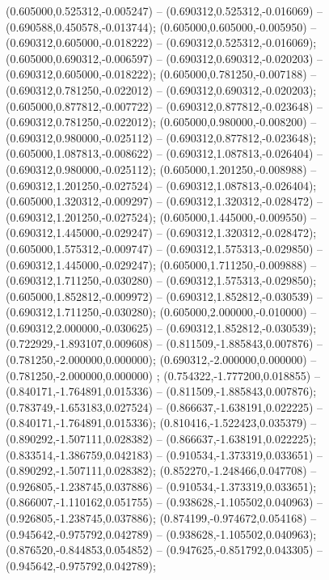  (0.605000,0.525312,-0.005247) -- (0.690312,0.525312,-0.016069) -- (0.690588,0.450578,-0.013744);
 (0.605000,0.605000,-0.005950) -- (0.690312,0.605000,-0.018222) -- (0.690312,0.525312,-0.016069);
 (0.605000,0.690312,-0.006597) -- (0.690312,0.690312,-0.020203) -- (0.690312,0.605000,-0.018222);
 (0.605000,0.781250,-0.007188) -- (0.690312,0.781250,-0.022012) -- (0.690312,0.690312,-0.020203);
 (0.605000,0.877812,-0.007722) -- (0.690312,0.877812,-0.023648) -- (0.690312,0.781250,-0.022012);
 (0.605000,0.980000,-0.008200) -- (0.690312,0.980000,-0.025112) -- (0.690312,0.877812,-0.023648);
 (0.605000,1.087813,-0.008622) -- (0.690312,1.087813,-0.026404) -- (0.690312,0.980000,-0.025112);
 (0.605000,1.201250,-0.008988) -- (0.690312,1.201250,-0.027524) -- (0.690312,1.087813,-0.026404);
 (0.605000,1.320312,-0.009297) -- (0.690312,1.320312,-0.028472) -- (0.690312,1.201250,-0.027524);
 (0.605000,1.445000,-0.009550) -- (0.690312,1.445000,-0.029247) -- (0.690312,1.320312,-0.028472);
 (0.605000,1.575312,-0.009747) -- (0.690312,1.575313,-0.029850) -- (0.690312,1.445000,-0.029247);
 (0.605000,1.711250,-0.009888) -- (0.690312,1.711250,-0.030280) -- (0.690312,1.575313,-0.029850);
 (0.605000,1.852812,-0.009972) -- (0.690312,1.852812,-0.030539) -- (0.690312,1.711250,-0.030280);
 (0.605000,2.000000,-0.010000) -- (0.690312,2.000000,-0.030625) -- (0.690312,1.852812,-0.030539);
 (0.722929,-1.893107,0.009608) -- (0.811509,-1.885843,0.007876) -- (0.781250,-2.000000,0.000000);
 (0.690312,-2.000000,0.000000) -- (0.781250,-2.000000,0.000000) ;
 (0.754322,-1.777200,0.018855) -- (0.840171,-1.764891,0.015336) -- (0.811509,-1.885843,0.007876);
 (0.783749,-1.653183,0.027524) -- (0.866637,-1.638191,0.022225) -- (0.840171,-1.764891,0.015336);
 (0.810416,-1.522423,0.035379) -- (0.890292,-1.507111,0.028382) -- (0.866637,-1.638191,0.022225);
 (0.833514,-1.386759,0.042183) -- (0.910534,-1.373319,0.033651) -- (0.890292,-1.507111,0.028382);
 (0.852270,-1.248466,0.047708) -- (0.926805,-1.238745,0.037886) -- (0.910534,-1.373319,0.033651);
 (0.866007,-1.110162,0.051755) -- (0.938628,-1.105502,0.040963) -- (0.926805,-1.238745,0.037886);
 (0.874199,-0.974672,0.054168) -- (0.945642,-0.975792,0.042789) -- (0.938628,-1.105502,0.040963);
 (0.876520,-0.844853,0.054852) -- (0.947625,-0.851792,0.043305) -- (0.945642,-0.975792,0.042789);
